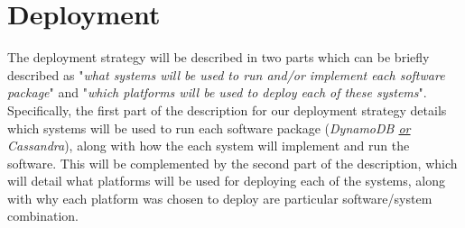 \newpage







\section{Deployment}

The deployment strategy will be described in two parts which can be briefly described as "\emph{what systems will be used to run and/or implement each software package}" and "\emph{which platforms will be used to deploy each of these systems}".  Specifically, the first part of the description for our deployment strategy details which systems will be used to run each software package (\emph{DynamoDB \underline{or} Cassandra}), along with how the each system will implement and run the software.  This will be complemented by the second part of the description, which will detail what platforms will be used for deploying each of the systems, along with why each platform was chosen to deploy are particular software/system combination.  




























































